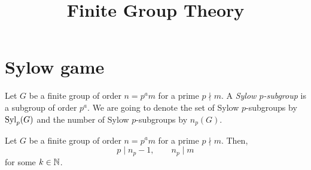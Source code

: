\documentclass{../exp}
\title{Finite Group Theory}
\begin{document}
\maketitle
\tableofcontents

\section{Sylow game}
\begin{defn}
Let $G$ be a finite group of order $n=p^am$ for a prime $p\nmid m$.
A \emph{Sylow $p$-subgroup} is a subgroup of order $p^a$.
We are going to denote the set of Sylow $p$-subgroups by $\operatorname{Syl}_p(G)$ and the number of Sylow $p$-subgroups by $n_p(G)$.
\end{defn}

\begin{thm}
Let $G$ be a finite group of order $n=p^am$ for a prime $p\nmid m$.
Then,
\[p\mid n_p-1,\qquad n_p\mid m\]
for some $k\in\mathbb{N}$.
\end{thm}
\end{document}
